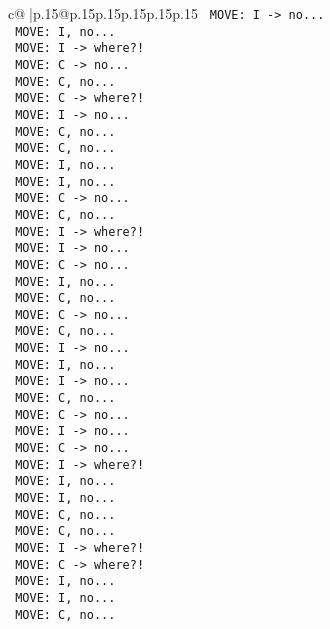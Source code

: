 \documentclass{article}
\begin{document}
{\begin{supertabular}{c@{$\;$}|p{.15\linewidth}@{}p{.15\linewidth}p{.15\linewidth}p{.15\linewidth}p{.15\linewidth}p{.15\linewidth}}
{{{\texttt{ MOVE: I {-}> no...} \\
\texttt{ MOVE: I, no...} \\
\texttt{ MOVE: I {-}> where?!} \\
\texttt{ MOVE: C {-}> no...} \\
\texttt{ MOVE: C, no...} \\
\texttt{ MOVE: C {-}> where?!} \\
\texttt{ MOVE: I {-}> no...} \\
\texttt{ MOVE: C, no...} \\
\texttt{ MOVE: C, no...} \\
\texttt{ MOVE: I, no...} \\
\texttt{ MOVE: I, no...} \\
\texttt{ MOVE: C {-}> no...} \\
\texttt{ MOVE: C, no...} \\
\texttt{ MOVE: I {-}> where?!} \\
\texttt{ MOVE: I {-}> no...} \\
\texttt{ MOVE: C {-}> no...} \\
\texttt{ MOVE: I, no...} \\
\texttt{ MOVE: C, no...} \\
\texttt{ MOVE: C {-}> no...} \\
\texttt{ MOVE: C, no...} \\
\texttt{ MOVE: I {-}> no...} \\
\texttt{ MOVE: I, no...} \\
\texttt{ MOVE: I {-}> no...} \\
\texttt{ MOVE: C, no...} \\
\texttt{ MOVE: C {-}> no...} \\
\texttt{ MOVE: I {-}> no...} \\
\texttt{ MOVE: C {-}> no...} \\
\texttt{ MOVE: I {-}> where?!} \\
\texttt{ MOVE: I, no...} \\
\texttt{ MOVE: I, no...} \\
\texttt{ MOVE: C, no...} \\
\texttt{ MOVE: C, no...} \\
\texttt{ MOVE: I {-}> where?!} \\
\texttt{ MOVE: C {-}> where?!} \\
\texttt{ MOVE: I, no...} \\
\texttt{ MOVE: I, no...} \\
\texttt{ MOVE: C, no...} \\
}}}
\end{supertabular}}
\end{document}
